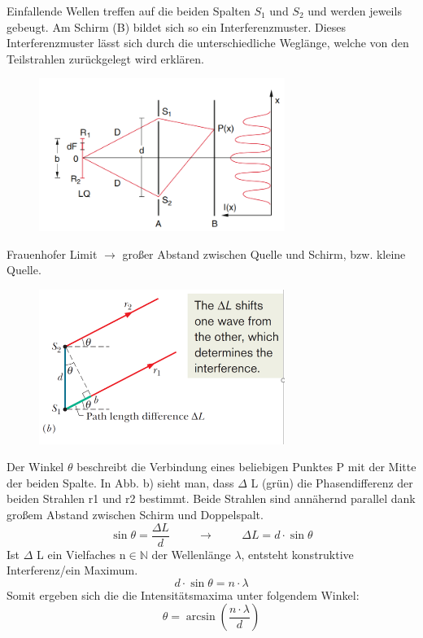 \documentclass[a4paper, 11pt, ngerman, parskip=half-]{scrartcl}
\begin{document}
Einfallende Wellen treffen auf die beiden Spalten $S_1$ und $S_2$ und werden jeweils gebeugt. Am Schirm (B) bildet sich so ein Interferenzmuster. 
Dieses Interferenzmuster lässt sich durch die unterschiedliche Weglänge, welche von den Teilstrahlen zurückgelegt wird erklären.
\begin{figure}[H]
    \centering
    \includegraphics[width=8cm]{image/18_Interferenz/Youngscher_Doppelspalt.png}
\end{figure}
Frauenhofer Limit $\rightarrow$ großer Abstand zwischen Quelle und Schirm, bzw. kleine Quelle.
\begin{figure}[H]
    \centering
    \includegraphics[width=8cm]{image/18_Interferenz/Doppelspalt_Wegunterschied.png}
\end{figure}
Der Winkel $\theta$ beschreibt die Verbindung eines beliebigen Punktes P mit der Mitte der beiden Spalte. 
In Abb. b) sieht man, dass $\Delta$ L (grün) die Phasendifferenz der beiden Strahlen r1 und r2 bestimmt. Beide 
Strahlen sind annähernd parallel dank großem Abstand zwischen Schirm und Doppelspalt. 
\[\sin \theta = \frac{\Delta L}{d} \hspace{1cm} \rightarrow \hspace{1cm} \Delta L = d \cdot \sin \theta\]
Ist $\Delta$ L ein Vielfaches n$\in\mathbb{N}$ der Wellenlänge $\lambda$, entsteht konstruktive Interferenz/ein Maximum.
\[d \cdot \sin \theta = n \cdot \lambda\]
Somit ergeben sich die die Intensitätsmaxima unter folgendem Winkel:
\begin{equation}
    \label{eq:Intensitaetsmaxima_Young_Doppelspalt}
    \theta = \arcsin(\frac{n \cdot \lambda}{d})
\end{equation}
\end{document}
